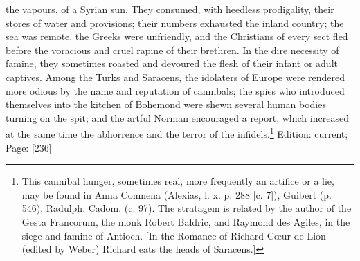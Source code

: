 the vapours, of a Syrian sun. They consumed, with heedless prodigality, their stores of water and provisions; their numbers exhausted the inland country; the sea was remote, the Greeks were unfriendly, and the Christians of every sect fled before the voracious and cruel rapine of their brethren. In the dire necessity of famine, they sometimes roasted and devoured the flesh of their infant or adult captives. Among the Turks and Saracens, the idolaters of Europe were rendered more odious by the name and reputation of cannibals; the spies who introduced themselves into the kitchen of Bohemond were shewn several human bodies turning on the spit; and the artful Norman encouraged a report, which increased at the same time the abhorrence and the terror of the infidels.\footnote{This cannibal hunger, sometimes real, more frequently an artifice or a lie, may be found in Anna Comnena (Alexias, l. x. p. 288 [c. 7]), Guibert (p. 546), Radulph. Cadom. (c. 97). The stratagem is related by the author of the Gesta Francorum, the monk Robert Baldric, and Raymond des Agiles, in the siege and famine of Antioch. [In the Romance of Richard Cœur de Lion (edited by Weber) Richard eats the heads of Saracens.]}
Edition: current; Page: [236]

